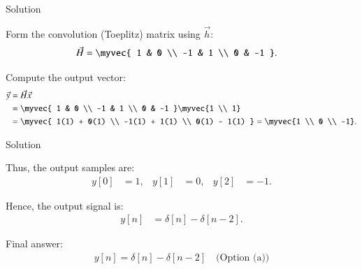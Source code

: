 \documentclass{beamer}
\begin{document}
\begin{frame}{Solution}


Form the convolution (Toeplitz) matrix using $\vec{h}$:
\begin{align}
\vec{H} &= 
\myvec{
1 & 0 \\
-1 & 1 \\
0 & -1
}.
\end{align}

Compute the output vector:
\begin{align}
\vec{y} &= \vec{H}\vec{x} \nonumber \\
&= 
\myvec{
1 & 0 \\
-1 & 1 \\
0 & -1
}
\myvec{1 \\ 1} \nonumber \\
&= 
\myvec{
1(1) + 0(1) \\
-1(1) + 1(1) \\
0(1) - 1(1)
} =
\myvec{1 \\ 0 \\ -1}.
\end{align}
\end{frame}
\begin{frame}{Solution}

Thus, the output samples are:
\begin{align}
y[0] &= 1, &
y[1] &= 0, &
y[2] &= -1.
\end{align}

Hence, the output signal is:
\begin{align}
y[n] &= \delta[n] - \delta[n-2].
\end{align}

Final answer:
\begin{align}
\boxed{y[n] = \delta[n] - \delta[n-2] \quad \text{(Option (a))}}
\end{align}

\end{frame}
\end{document}

